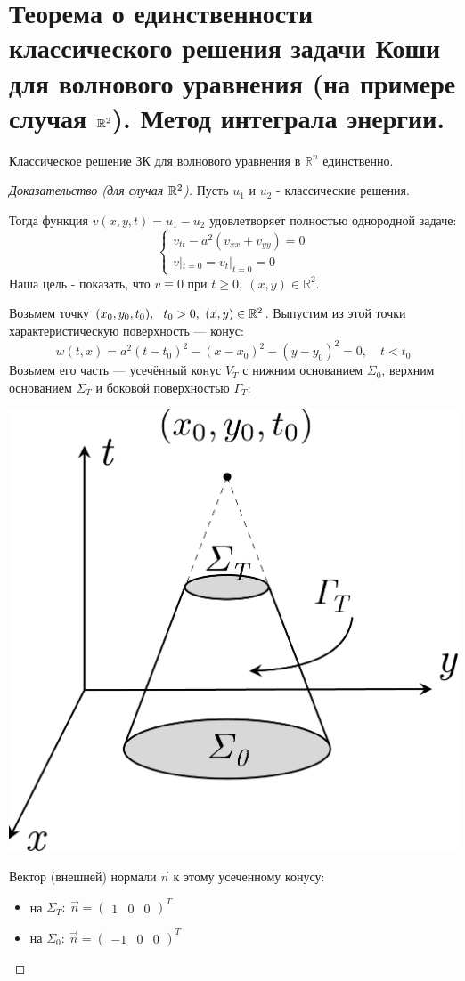 \documentclass[../main.tex]{subfiles}
\begin{document}
\section[Теорема единственности для волнового уравнения]{Теорема о единственности классического решения задачи Коши для волнового уравнения (на примере случая $\mathbb{R}^2$). Метод интеграла энергии.}


\begin{theorem} Классическое решение ЗК для волнового уравнения в $\mathbb{R}^n$ единственно.
\end{theorem}
\begin{proof}[Доказательство (для случая $\mathbb{R}^2$)]
Пусть $u_{1}$ и $u_{2}$ - классические решения.

Тогда функция $v(x,y,t) = u_1 - u_2$ удовлетворяет полностью однородной задаче: 
$$
\begin{cases}
  v_{tt} - a^2(v_{xx} + v_{yy}) = 0\\
  v|_{t=0} = v_t|_{t=0} = 0
\end{cases}
$$
Наша цель - показать, что $v\equiv 0 $ при $ t\geq 0,\ (x,y) \in \mathbb{R}^2$.

Возьмем точку $ (x_0, y_0, t_0),\ \ t_0 > 0,\ (x,y) \in \mathbb{R}^2$. \; Выпустим из этой точки характеристическую поверхность --- конус:
$$ 
w(t,x) = a^2(t - t_0)^2 - (x - x_0)^2 - (y - y_0)^2 = 0,\quad t < t_0
$$
Возьмем его часть --- усечённый конус $ V_T $ с нижним основанием $ \Sigma_0 $, верхним основанием $ \Sigma_T $  и боковой поверхностью $ \Gamma_T:$
\begin{center}
\includegraphics[width=0.28\linewidth]{./pic 8.pdf}
\end{center}
Вектор (внешней) нормали $ \vec{n} $ к этому усеченному конусу:
\begin{itemize}
	\item на $\Sigma_T:\ \vec{n} = \begin{pmatrix}1 & 0 & 0\end{pmatrix}^T $
	
	\item на $\Sigma_0:\ \vec{n} = \begin{pmatrix}-1 & 0 & 0\end{pmatrix}^T $
	

\end{itemize}
\end{proof}
\end{document}
